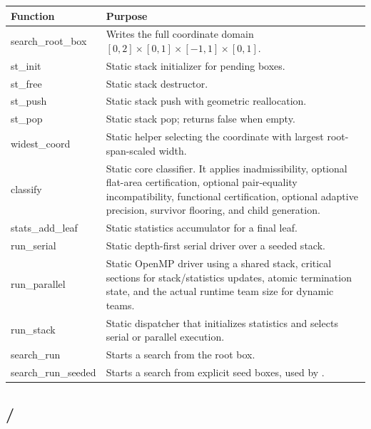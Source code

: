 \documentclass[11pt]{article}
\DeclareRobustCommand{\code}[1]{\texttt{\detokenize{#1}}}
\begin{document}
\begin{longtable}{>{\ttfamily}p{}p{}}
\toprule
Function & Purpose \\
\midrule
\endhead
search\_root\_box & Writes the full coordinate domain \([0,2]\times[0,1]\times[-1,1]\times[0,1]\). \\
st\_init & Static stack initializer for pending boxes. \\
st\_free & Static stack destructor. \\
st\_push & Static stack push with geometric reallocation. \\
st\_pop & Static stack pop; returns false when empty. \\
widest\_coord & Static helper selecting the coordinate with largest root-span-scaled width. \\
classify & Static core classifier.  It applies inadmissibility, optional flat-area certification, optional pair-equality incompatibility, functional certification, optional adaptive precision, survivor flooring, and child generation. \\
stats\_add\_leaf & Static statistics accumulator for a final leaf. \\
run\_serial & Static depth-first serial driver over a seeded stack. \\
run\_parallel & Static OpenMP driver using a shared stack, critical sections for stack/statistics updates, atomic termination state, and the actual runtime team size for dynamic teams. \\
run\_stack & Static dispatcher that initializes statistics and selects serial or parallel execution. \\
search\_run & Starts a search from the root box. \\
search\_run\_seeded & Starts a search from explicit seed boxes, used by \code{--refine}. \\
\bottomrule
\end{longtable}

\subsection{\code{threshold.c}/\code{threshold.h}}
\end{document}
